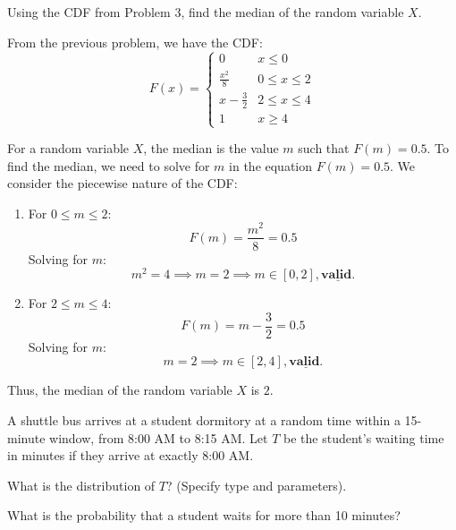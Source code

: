\documentclass[a4paper, 10pt]{article}
\begin{document}


\begin{problem}
Using the CDF from Problem 3, find the median of the random variable \( X \).
\end{problem}

\begin{solution}
From the previous problem, we have the CDF:
\[
F(x) = \begin{cases}
    0 & x \leq 0 \\
    \frac{x^2}{8} & 0 \leq x \leq 2 \\
    x - \frac{3}{2} & 2 \leq x \leq 4 \\
    1 & x \geq 4
\end{cases}
\]

For a random variable \( X \), the median is the value \( m \) such that \( F(m) = 0.5 \).
To find the median, we need to solve for \( m \) in the equation \( F(m) = 0.5 \).
We consider the piecewise nature of the CDF:
\begin{enumerate}
    \item For \( 0 \leq m \leq 2 \):
    \[
    F(m) = \frac{m^2}{8} = 0.5
    \]
    Solving for \( m \):
    \[
    m^2 = 4 \implies m = 2 \implies m \in [0, 2], \underline{\textbf{valid.}}
    \]
    
    \item For \( 2 \leq m \leq 4 \):
    \[
    F(m) = m - \frac{3}{2} = 0.5
    \]
    Solving for \( m \):
    \[
    m = 2 \implies m \in [2, 4], \underline{\textbf{valid.}}
    \]
\end{enumerate}

Thus, the median of the random variable \( X \) is \( \boxed{2} \).
\end{solution}


\begin{problem}
A shuttle bus arrives at a student dormitory at a random time within a 15-minute window, from 8:00 AM to 8:15 AM.
Let \( T \) be the student's waiting time in minutes if they arrive at exactly 8:00 AM.
\begin{subproblems}
    \item What is the distribution of \( T \)? (Specify type and parameters).
    \item What is the probability that a student waits for more than 10 minutes?
\end{subproblems}
\end{problem}
\end{document}
